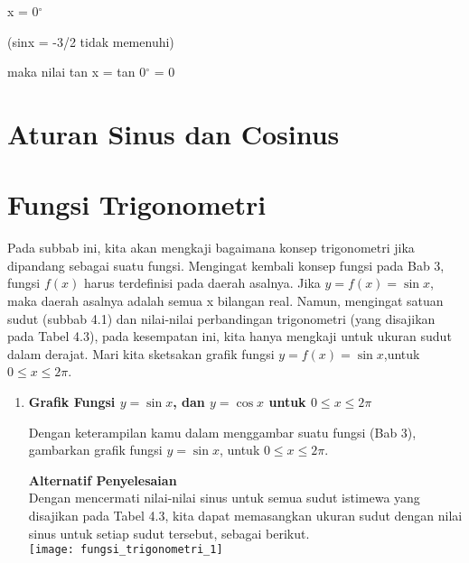 \documentclass[11pt,fleqn]{book} %
\begin{document}
\begin{myEnumerate}
\begin{itemize}
\noindent x = 0${}^\circ$

\noindent (sinx = -3/2 tidak memenuhi)

\noindent maka nilai tan x = tan 0${}^\circ$ = 0

\noindent 

\noindent \textbf{}

\noindent 

\section{Aturan Sinus dan Cosinus}

\section{Fungsi Trigonometri}

Pada subbab ini, kita akan  mengkaji bagaimana konsep trigonometri jika dipandang sebagai suatu fungsi. Mengingat kembali konsep fungsi pada Bab 3, fungsi $f(x)$ harus terdefinisi pada daerah asalnya. Jika $y = f(x) = \sin x$, maka daerah asalnya adalah semua x bilangan real. Namun, mengingat satuan sudut  (subbab 4.1) dan nilai-nilai perbandingan trigonometri (yang disajikan pada Tabel 4.3),  pada kesempatan ini, kita hanya mengkaji  untuk  ukuran sudut dalam derajat. Mari kita sketsakan grafik fungsi $y = f(x) = \sin x$,untuk $0 \leq x\leq 2\pi$.\\

\begin{enumerate}
\item \textbf{Grafik Fungsi $y = \sin x$, dan $y = \cos x$ untuk $0 \leq x\leq 2\pi$}\\
\begin{problem}
Dengan keterampilan kamu dalam menggambar suatu fungsi (Bab 3), gambarkan grafik fungsi $y = \sin x$, untuk $0 \leq x\leq 2\pi$.\\
\end{problem}
\textbf{Alternatif Penyelesaian}\\
Dengan mencermati nilai-nilai sinus untuk semua sudut istimewa yang disajikan pada Tabel 4.3, kita dapat memasangkan ukuran sudut dengan nilai sinus untuk setiap sudut tersebut, sebagai berikut.\\

\texttt{[image: fungsi\_trigonometri\_1]}


\end{enumerate}
\end{itemize}
\end{myEnumerate}
\end{document}
